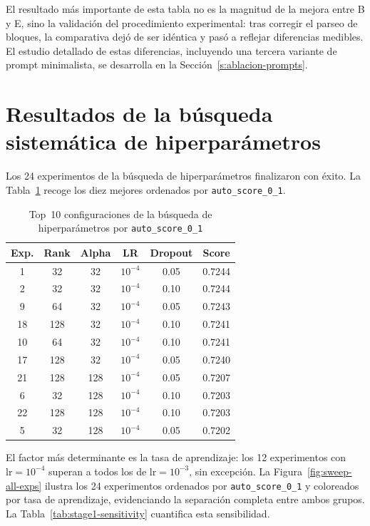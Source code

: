\documentclass[%
    school=etsisi,%
    type=pfg,%
    degree=61CD,%
]{upm-report}
\begin{document}
El resultado m\'as importante de esta tabla no es la magnitud de la mejora entre B y E, sino la validaci\'on del procedimiento experimental: tras corregir el parseo de bloques, la comparativa dej\'o de ser id\'entica y pas\'o a reflejar diferencias medibles. El estudio detallado de estas diferencias, incluyendo una tercera variante de prompt minimalista, se desarrolla en la Secci\'on~\ref{s:ablacion-prompts}.

\section{Resultados de la b\'usqueda sistem\'atica de hiperpar\'ametros}
\label{s:stage1-resultados}

Los 24 experimentos de la b\'usqueda de hiperpar\'ametros finalizaron con \'exito. La Tabla~\ref{tab:stage1-top10} recoge los diez mejores ordenados por \texttt{auto\_score\_0\_1}.

\begin{table}[H]
    \centering
    \caption{Top~10 configuraciones de la b\'usqueda de hiperpar\'ametros por \texttt{auto\_score\_0\_1}}
    \label{tab:stage1-top10}
    \begin{tabular}{cccccc}
        \toprule
        \textbf{Exp.} & \textbf{Rank} & \textbf{Alpha} & \textbf{LR} & \textbf{Dropout} & \textbf{Score} \\
        \midrule
        1  & 32  & 32  & $10^{-4}$ & 0.05 & 0.7244 \\
        2  & 32  & 32  & $10^{-4}$ & 0.10 & 0.7244 \\
        9  & 64  & 32  & $10^{-4}$ & 0.05 & 0.7243 \\
        18 & 128 & 32  & $10^{-4}$ & 0.10 & 0.7241 \\
        10 & 64  & 32  & $10^{-4}$ & 0.10 & 0.7241 \\
        17 & 128 & 32  & $10^{-4}$ & 0.05 & 0.7240 \\
        21 & 128 & 128 & $10^{-4}$ & 0.05 & 0.7207 \\
        6  & 32  & 128 & $10^{-4}$ & 0.10 & 0.7203 \\
        22 & 128 & 128 & $10^{-4}$ & 0.10 & 0.7203 \\
        5  & 32  & 128 & $10^{-4}$ & 0.05 & 0.7202 \\
        \bottomrule
    \end{tabular}
\end{table}

El factor m\'as determinante es la tasa de aprendizaje: los 12 experimentos con $\text{lr} = 10^{-4}$ superan a todos los de $\text{lr} = 10^{-3}$, sin excepci\'on. La Figura~\ref{fig:sweep-all-exps} ilustra los 24 experimentos ordenados por \texttt{auto\_score\_0\_1} y coloreados por tasa de aprendizaje, evidenciando la separaci\'on completa entre ambos grupos. La Tabla~\ref{tab:stage1-sensitivity} cuantifica esta sensibilidad.
\end{document}
